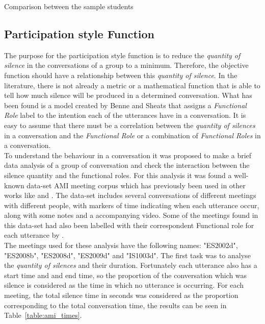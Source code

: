 \begin{table}[!htb]
\begin{subtable}{.5\linewidth}
    \end{subtable} 
    \caption{Comparison between the sample students}
    \label{table:results_interests_comp}
\end{table}

\subsection{Participation style Function}

The purpose for the participation style function is to reduce the \textit{quantity of silence} in the conversations of a group to a minimum. Therefore, the objective function should have a relationship between this \textit{quantity of silence}. In the literature, there is not already a metric or a mathematical function that is able to tell how much silence will be produced in a determined conversation. What has been found is a model created by Benne and Sheats \cite{FunctionalRoles} that assigns a \textit{Functional Role} label to the intention each of the utterances have in a conversation. It is easy to assume that there must be a correlation between the \textit{quantity of silences} in a conversation and the \textit{Functional Role} or a combination of \textit{Functional Roles} in a conversation.\\

To understand the behaviour in a conversation it was proposed to make a brief data analysis of a group of conversation and check the interaction between the silence quantity and the functional roles. For this analysis it was found a well-known data-set AMI meeting corpus \cite{mccowan2005ami} which has previously been used in other works like \cite{dong2012modeling} and \cite{Matsuyama2015Four-participantParticipant}. The data-set includes several conversations of different meetings with different people, with markers of time indicating when each utterance occur, along with some notes and a accompanying video. Some of the meetings found in this data-set had also been labelled with their correspondent Functional role for each utterance by \cite{dong2012modeling}.\\

The meetings used for these analysis have the following names: "ES2002d", "ES2008b", "ES2008d", "ES2009d" and "IS1003d". The first task was to analyse the \textit{quantity of silences} and their duration. Fortunately each utterance also has a start time and and end time, so the proportion of the conversation which was silence is considered as the time in which no utterance is occurring. For each meeting, the total silence time in seconds was considered as the proportion corresponding to the total conversation time, the results can be seen in Table~\ref{table:ami_times}.\\

